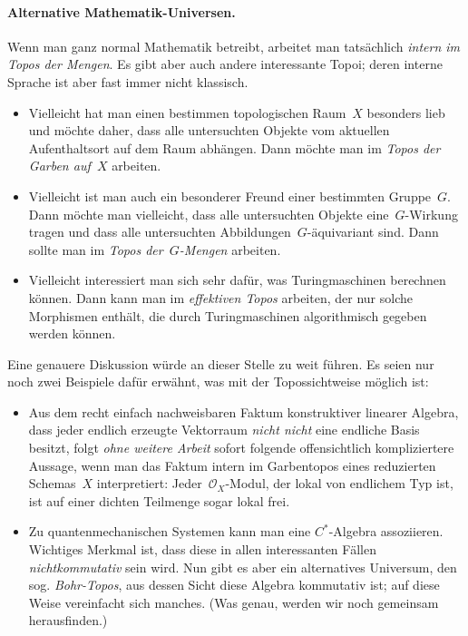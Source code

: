 \documentclass[a4paper,ngerman,12pt]{scrartcl}
\theoremstyle{definition}
\theoremstyle{plain}
\theoremstyle{remark}
\renewcommand{\O}{\mathcal{O}}
\renewcommand{\_}{\mathpunct{.}\,}
\newcommand{\?}{\,{:}\,}
\begin{document}
\paragraph{Alternative Mathematik-Universen.} Wenn man ganz normal Mathematik
betreibt, arbeitet man tatsächlich \emph{intern im Topos der Mengen}. Es gibt
aber auch andere interessante Topoi; deren interne Sprache ist aber fast immer
nicht klassisch.
\begin{itemize}
\item Vielleicht hat man einen bestimmen topologischen Raum~$X$ besonders lieb
und möchte daher, dass alle untersuchten Objekte vom aktuellen Aufenthaltsort
auf dem Raum abhängen. Dann möchte man im \emph{Topos der Garben auf~$X$}
arbeiten.
\item Vielleicht ist man auch ein besonderer Freund einer bestimmten
Gruppe~$G$. Dann möchte man vielleicht, dass alle untersuchten Objekte
eine~$G$-Wirkung tragen und dass alle untersuchten Abbildungen~$G$-äquivariant
sind. Dann sollte man im \emph{Topos der~$G$-Mengen} arbeiten.
\item Vielleicht interessiert man sich sehr dafür, was Turingmaschinen
berechnen können. Dann kann man im \emph{effektiven Topos} arbeiten, der nur
solche Morphismen enthält, die durch Turingmaschinen algorithmisch gegeben
werden können.
\end{itemize}
Eine genauere Diskussion würde an dieser Stelle zu weit
führen. Es seien nur noch zwei Beispiele dafür erwähnt, was mit der Topossichtweise
möglich ist:
\begin{itemize}
\item Aus dem recht einfach nachweisbaren Faktum konstruktiver linearer
Algebra, dass jeder endlich erzeugte Vektorraum \emph{nicht nicht} eine endliche
Basis besitzt, folgt \emph{ohne weitere Arbeit} sofort folgende offensichtlich
kompliziertere Aussage, wenn man das Faktum intern im Garbentopos eines reduzierten
Schemas~$X$ interpretiert: Jeder~$\O_X$-Modul, der lokal von endlichem Typ ist,
ist auf einer dichten Teilmenge sogar lokal frei.
\item Zu quantenmechanischen Systemen kann man eine $C^*$-Algebra assoziieren.
Wichtiges Merkmal ist, dass diese in allen interessanten Fällen
\emph{nichtkommutativ} sein wird. Nun gibt es aber ein alternatives Universum,
den sog. \emph{Bohr-Topos}, aus dessen Sicht diese Algebra kommutativ ist; auf
diese Weise vereinfacht sich manches. (Was genau, werden wir noch gemeinsam
herausfinden.)
\end{itemize}
\end{document}
